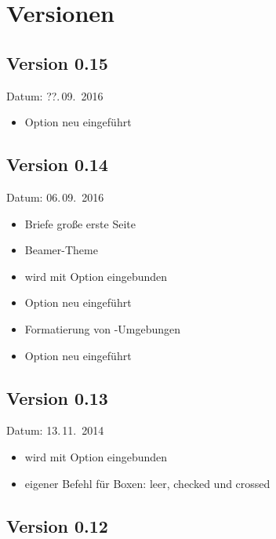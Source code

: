 
\cleardoublepage
\section{Versionen}

\subsection{Version 0.15}

Datum: ??.\,09.~2016

\begin{itemize}
	\item Option  neu eingeführt
\end{itemize}

\subsection{Version 0.14}

Datum: 06.\,09.~2016

\begin{itemize}
	\item Briefe große erste Seite
	\item Beamer-Theme
	\item {} wird mit Option  eingebunden
	\item Option  neu eingeführt
	\item Formatierung von -Umgebungen
	\item Option  neu eingeführt
\end{itemize}

\subsection{Version 0.13}

Datum: 13.\,11.~2014

\begin{itemize}
	\item {} wird mit Option  eingebunden
	\item eigener Befehl  für Boxen: leer, checked und crossed
\end{itemize}

\subsection{Version 0.12}

